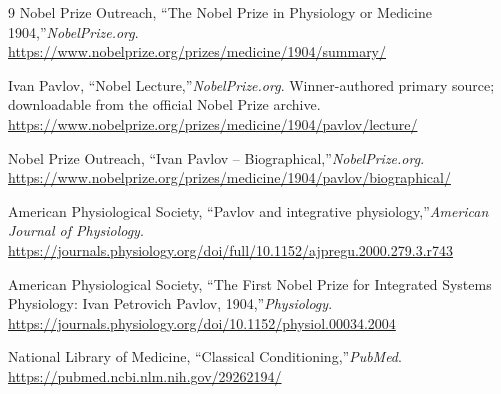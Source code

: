 \begin{thebibliography}{9}
Nobel Prize Outreach, ``The Nobel Prize in Physiology or Medicine 1904,''\emph{NobelPrize.org}.\\
\url{https://www.nobelprize.org/prizes/medicine/1904/summary/}

Ivan Pavlov, ``Nobel Lecture,''\emph{NobelPrize.org}. Winner-authored primary source; downloadable from the official Nobel Prize archive.\\
\url{https://www.nobelprize.org/prizes/medicine/1904/pavlov/lecture/}

Nobel Prize Outreach, ``Ivan Pavlov -- Biographical,''\emph{NobelPrize.org}.\\
\url{https://www.nobelprize.org/prizes/medicine/1904/pavlov/biographical/}

American Physiological Society, ``Pavlov and integrative physiology,''\emph{American Journal of Physiology}.\\
\url{https://journals.physiology.org/doi/full/10.1152/ajpregu.2000.279.3.r743}

American Physiological Society, ``The First Nobel Prize for Integrated Systems Physiology: Ivan Petrovich Pavlov, 1904,''\emph{Physiology}.\\
\url{https://journals.physiology.org/doi/10.1152/physiol.00034.2004}

National Library of Medicine, ``Classical Conditioning,''\emph{PubMed}.\\
\url{https://pubmed.ncbi.nlm.nih.gov/29262194/}
\end{thebibliography}

